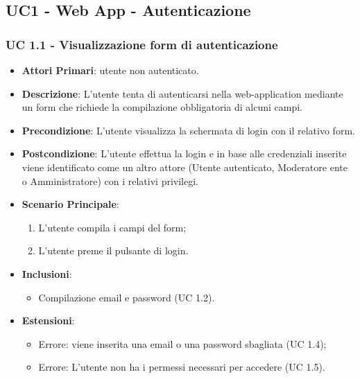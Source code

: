	\subsection{UC1 - Web App - Autenticazione}
		
		

		\subsubsection{UC 1.1 - Visualizzazione form di autenticazione}

		\begin{itemize}
			\item \textbf{Attori Primari}: utente non autenticato.
			\item \textbf{Descrizione}: L'utente tenta di autenticarsi nella web-application mediante un form che richiede la compilazione obbligatoria di alcuni campi.
			\item \textbf{Precondizione}: L'utente visualizza la schermata di login con il relativo form.
			\item \textbf{Postcondizione}: L'utente effettua la login e in base alle credenziali inserite viene identificato come un altro attore (Utente autenticato, Moderatore ente o Amministratore) con i relativi privilegi.
			\item \textbf{Scenario Principale}:
			\begin{enumerate}
				\item L'utente compila i campi del form;
				\item L'utente preme il pulsante di login.
			\end{enumerate}
			\item \textbf{Inclusioni}:
				\begin{itemize}
					\item Compilazione email e password (UC 1.2).
				\end{itemize}
			\item \textbf{Estensioni}:
				\begin{itemize}
					\item Errore: viene inserita una email o una password sbagliata (UC 1.4);
					\item Errore: L'utente non ha i permessi necessari per accedere (UC 1.5).
				\end{itemize}
		\end{itemize}


